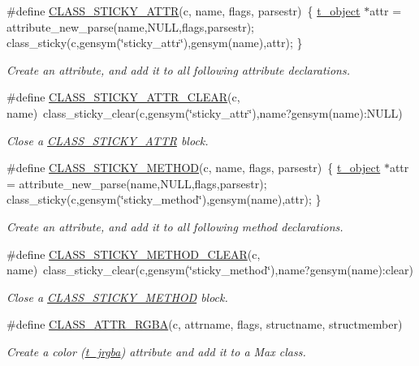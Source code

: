 \begin{DoxyCompactItemize}
\#define \hyperlink{group__attr_ga51ce88a6d20e819ad703514e583e5562}{CLASS\_\-STICKY\_\-ATTR}(c, name, flags, parsestr)~\{ \hyperlink{structt__object}{t\_\-object} $\ast$attr = attribute\_\-new\_\-parse(name,NULL,flags,parsestr); class\_\-sticky(c,gensym(\char`\"{}sticky\_\-attr\char`\"{}),gensym(name),attr); \}
\begin{DoxyCompactList}\small\item\em Create an attribute, and add it to all following attribute declarations. \item\end{DoxyCompactList}\item 
\#define \hyperlink{group__attr_gadf3ca4c22b0273a96f5644788489970b}{CLASS\_\-STICKY\_\-ATTR\_\-CLEAR}(c, name)~class\_\-sticky\_\-clear(c,gensym(\char`\"{}sticky\_\-attr\char`\"{}),name?gensym(name):NULL)
\begin{DoxyCompactList}\small\item\em Close a \hyperlink{group__attr_ga51ce88a6d20e819ad703514e583e5562}{CLASS\_\-STICKY\_\-ATTR} block. \item\end{DoxyCompactList}\item 
\#define \hyperlink{group__attr_ga864386ce13dd707052d2fef6bc927576}{CLASS\_\-STICKY\_\-METHOD}(c, name, flags, parsestr)~\{ \hyperlink{structt__object}{t\_\-object} $\ast$attr = attribute\_\-new\_\-parse(name,NULL,flags,parsestr); class\_\-sticky(c,gensym(\char`\"{}sticky\_\-method\char`\"{}),gensym(name),attr); \}
\begin{DoxyCompactList}\small\item\em Create an attribute, and add it to all following method declarations. \item\end{DoxyCompactList}\item 
\#define \hyperlink{group__attr_gaa7a445747716396d70d8fa6fb65861dc}{CLASS\_\-STICKY\_\-METHOD\_\-CLEAR}(c, name)~class\_\-sticky\_\-clear(c,gensym(\char`\"{}sticky\_\-method\char`\"{}),name?gensym(name):clear)
\begin{DoxyCompactList}\small\item\em Close a \hyperlink{group__attr_ga864386ce13dd707052d2fef6bc927576}{CLASS\_\-STICKY\_\-METHOD} block. \item\end{DoxyCompactList}\item 
\#define \hyperlink{group__attr_ga24f3c54d0847a6e117a3a48beb44efac}{CLASS\_\-ATTR\_\-RGBA}(c, attrname, flags, structname, structmember)
\begin{DoxyCompactList}\small\item\em Create a color (\hyperlink{structt__jrgba}{t\_\-jrgba}) attribute and add it to a Max class. \item\end{DoxyCompactList}\end{DoxyCompactItemize}
